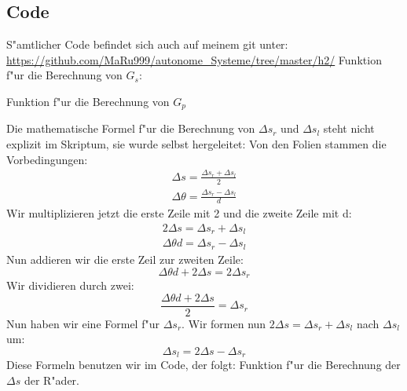 \documentclass[11pt]{article}
\begin{document}
    \subsection{Code}\label{subsec:code}
    S"amtlicher Code befindet sich auch auf meinem git unter:\newline
    \href{https://github.com/MaRu999/autonome\_Systeme/tree/master/h2/}{https://github.com/MaRu999/autonome\_Systeme/tree/master/h2/}\newline
    Funktion f"ur die Berechnung von $G_{s}$:
    
    Funktion f"ur die Berechnung von $G_{p}$
    
    Die mathematische Formel f"ur die Berechnung von $\Delta s_{r}$ und $\Delta s_{l}$ steht nicht explizit im Skriptum, sie wurde selbst hergeleitet:
    Von den Folien stammen die Vorbedingungen:
    \begin{equation}
        \begin{aligned}
            \Delta s = \frac{\Delta s_{r} + \Delta s_{l}}{2} \\
            \Delta \theta = \frac{\Delta s_{r} - \Delta s_{l}}{d}
        \end{aligned}
    \end{equation}
    Wir multiplizieren jetzt die erste Zeile mit 2 und die zweite Zeile mit d:
    \begin{equation}
        \begin{aligned}
            2\Delta s = \Delta s_{r} + \Delta s_{l} \\
            \Delta \theta d = \Delta s_{r} - \Delta s_{l}
        \end{aligned}
    \end{equation}
    Nun addieren wir die erste Zeil zur zweiten Zeile:
    \begin{equation}
        \Delta \theta d + 2\Delta s = 2\Delta s_{r}
    \end{equation}
    Wir dividieren durch zwei:
    \begin{equation}
        \frac{\Delta \theta d + 2\Delta s}{2} = \Delta s_{r}
    \end{equation}
    Nun haben wir eine Formel f"ur $\Delta s_{r}$.
    Wir formen nun $2\Delta s = \Delta s_{r} + \Delta s_{l}$ nach $\Delta s_{l}$ um:
    \begin{equation}
        \Delta s_{l} = 2\Delta s - \Delta s_{r}
    \end{equation}
    Diese Formeln benutzen wir im Code, der folgt:
    Funktion f"ur die Berechnung der $\Delta s$ der R"ader.
\end{document}
